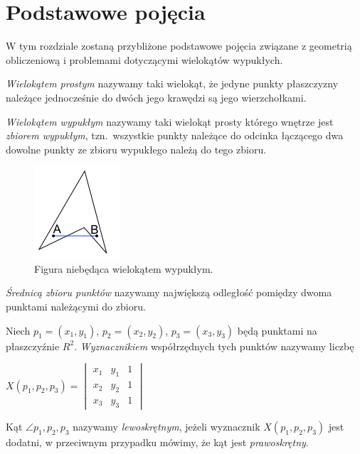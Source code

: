 \chapter{Podstawowe pojęcia}\label{chap:pojecia}
W tym rozdziale zostaną przybliżone podstawowe pojęcia związane
z geometrią obliczeniową i problemami dotyczącymi wielokątów
wypukłych.

\begin{definicja}
  \emph{Wielokątem prostym} nazywamy taki wielokąt, że jedyne punkty
  płaszczyzny należące jednocześnie do dwóch jego krawędzi są jego
  wierzchołkami.
\end{definicja}

\begin{definicja}
  \emph{Wielokątem wypukłym} nazywamy taki wielokąt prosty którego
  wnętrze jest \emph{zbiorem wypukłym}, tzn.\ wszystkie punkty
  należące do odcinka łączącego dwa dowolne punkty ze zbioru wypukłego
  należą do tego zbioru.
\end{definicja}


\begin{figure}[htb]
  \centering
  \includegraphics{img/nonconvex}
  \caption{Figura niebędąca wielokątem wypukłym.}
\end{figure}

\begin{definicja}
  \emph{Średnicą zbioru punktów} nazywamy największą odległość
  pomiędzy dwoma punktami należącymi do zbioru.
\end{definicja}

\begin{definicja}
  Niech $p_{1}=(x_{1},y_{1})$, $p_{2}=(x_{2},y_{2})$,
  $p_{3}=(x_{3},y_{3})$ będą punktami na płaszczyźnie
  $R^2$. \emph{Wyznacznikiem} współrzędnych tych punktów nazywamy
  liczbę

  \begin{center}
    \begin{math}
      X(p_1, p_2, p_3) =
      \begin{vmatrix}
        x_1 & y_1 & 1 \\
        x_2 & y_2 & 1 \\
        x_3 & y_3 & 1
      \end{vmatrix}
    \end{math}
  \end{center}

  Kąt $\angle p_{1},p_{2},p_{3}$ nazywamy \emph{lewoskrętnym}, jeżeli
  wyznacznik $X(p_1, p_2, p_3)$ jest dodatni, w przeciwnym przypadku
  mówimy, że kąt jest \emph{prawoskrętny}.
\end{definicja}

